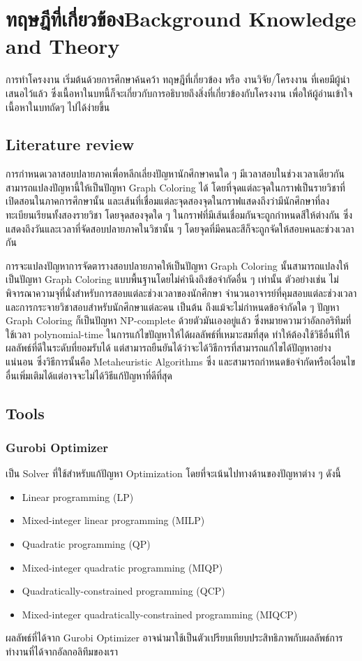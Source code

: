 \chapter{\ifcpe ทฤษฎีที่เกี่ยวข้อง\else Background Knowledge and Theory\fi}
การทำโครงงาน เริ่มต้นด้วยการศึกษาค้นคว้า ทฤษฎีที่เกี่ยวข้อง หรือ งานวิจัย/โครงงาน ที่เคยมีผู้นำเสนอไว้แล้ว ซึ่งเนื้อหาในบทนี้ก็จะเกี่ยวกับการอธิบายถึงสิ่งที่เกี่ยวข้องกับโครงงาน เพื่อให้ผู้อ่านเข้าใจเนื้อหาในบทถัดๆ ไปได้ง่ายขึ้น
\section{Literature review}
การกำหนดเวลาสอบปลายภาคเพื่อหลีกเลี่ยงปัญหานักศึกษาคนใด ๆ มีเวลาสอบในช่วงเวลาเดียวกันสามารถแปลงปัญหานี้ให้เป็นปัญหา Graph Coloring ได้ 
โดยที่จุดแต่ละจุดในกราฟเป็นรายวิชาที่เปิดสอนในภาคการศึกษานั้น 
และเส้นที่เชื่อมแต่ละจุดสองจุดในกราฟแสดงถึงว่ามีนักศึกษาที่ลงทะเบียนเรียนทั้งสองรายวิชา โดยจุดสองจุดใด ๆ ในกราฟที่มีเส้นเชื่อมกันจะถูกกำหนดสีให้ต่างกัน
ซึ่งแสดงถึงวันและเวลาที่จัดสอบปลายภาคในวิชานั้น ๆ โดยจุดที่มีคนละสีก็จะถูกจัดให้สอบคนละช่วงเวลากัน

การจะแปลงปัญหาการจัดตารางสอบปลายภาคให้เป็นปัญหา Graph Coloring นั้นสามารถแปลงให้เป็นปัญหา Graph Coloring แบบพื้นฐานโดยไม่คำนึงถึงข้อจำกัดอื่น ๆ เท่านั้น\cite{mcs} 
ตัวอย่างเช่น ไม่พิจารณาความจุที่นั่งสำหรับการสอบแต่ละช่วงเวลาของนักศึกษา จำนวนอาจารย์ที่คุมสอบแต่ละช่วงเวลา และการกระจายวิชาสอบสำหรับนักศึกษาแต่ละคน เป็นต้น
ถึงแม้จะไม่กำหนดข้อจำกัดใด ๆ ปัญหา Graph Coloring ก็เป็นปัญหา NP-complete ด้วยตัวมันเองอยู่แล้ว\cite{alg-design} 
ซึ่งหมายความว่าอัลกอริทึมที่ใช้เวลา polynomial-time ในการแก้ไขปัญหาให้ได้ผลลัพธ์ที่เหมาะสมที่สุด 
ทำให้ต้องใช้วิธีอื่นที่ให้ผลลัพธ์ที่ดีในระดับที่ยอมรับได้ แต่สามารถยืนยันได้ว่าจะได้วิธีการที่สามารถแก้ไขได้ปัญหาอย่างแน่นอน 
ซึ่งวิธีการนั้นคือ Metaheuristic Algorithms ซึ่ง และสามารถกำหนดข้อจำกัดหรือเงื่อนไขอื่นเพิ่มเติมได้แต่อาจจะไม่ได้วิธีแก้ปัญหาที่ดีที่สุด
\section{Tools}
\subsection{Gurobi Optimizer}
เป็น Solver ที่ใช้สำหรับแก้ปัญหา Optimization โดยที่จะเน้นไปทางด้านของปัญหาต่าง ๆ ดังนี้ 
\begin{itemize}
  \item Linear programming (LP)
  \item Mixed-integer linear programming (MILP)
  \item Quadratic programming (QP)
  \item Mixed-integer quadratic programming (MIQP)
  \item Quadratically-constrained programming (QCP)
  \item Mixed-integer quadratically-constrained programming (MIQCP)
\end{itemize}
ผลลัพธ์ที่ได้จาก Gurobi Optimizer อาจนำมาใช้เป็นตัวเปรียบเทียบประสิทธิภาพกับผลลัพธ์การทำงานที่ได้จากอัลกอลิทึมของเรา

